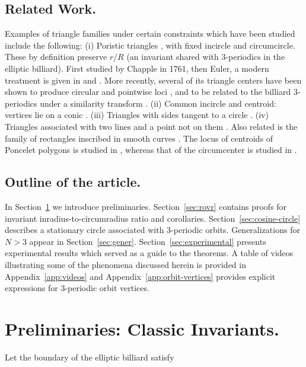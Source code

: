 \documentclass{amsart}
\theoremstyle{definition}
\begin{document}
\bigskip
\subsection{Related Work.}
Examples of triangle families under certain constraints which have been studied include the following: (i) Poristic triangles \cite{Gallatly1913}, with fixed incircle and circumcircle. These by definition   preserve  $r/R$ (an invariant shared with 3-periodics in the elliptic billiard). First studied by Chapple in 1761, then Euler, a modern treatment is given in \cite{Weaver1924,Weaver1933} and \cite{Murnaghan1925}. More recently, several of its triangle centers have been shown to produce circular and pointwise loci \cite{Odenhal2011}, and to be related to the billiard 3-periodics under a similarity transform \cite{garcia2020-poristics}. (ii) Common incircle and centroid: vertices lie on a conic \cite{Pamfilos2011}. (iii)
Triangles with sides tangent to a circle \cite{Nikolina-families2012}. (iv) Triangles associated with two lines and a point not on them \cite{Sliepcevic2013}. Also related is the family of rectangles inscribed in smooth curves \cite{schwartz2018-rectangles}. The locus of centroids of Poncelet polygons is studied in \cite{schwartz2016-com}, whereas that of the circumcenter is studied in \cite{ana2020}.

\bigskip
\subsection{Outline of the article.} In Section~\ref{sec:prelim} we introduce preliminaries. Section~\ref{sec:rovr} contains proofs for invariant inradius-to-circumradius ratio and corollaries. Section~\ref{sec:cosine-circle} describes a stationary circle associated with 3-periodic orbits. Generalizations for $N>3$ appear in Section~\ref{sec:gener}. Section~\ref{sec:experimental} presents experimental results which served as a guide to the theorems. A table of videos illustrating some of the phenomena discussed herein is provided in Appendix~\ref{app:videos} and Appendix~\ref{app:orbit-vertices} provides explicit expressions for 3-periodic orbit vertices.

\section{Preliminaries: Classic Invariants.}
\label{sec:prelim}
Let the boundary of the elliptic billiard satisfy
\end{document}
